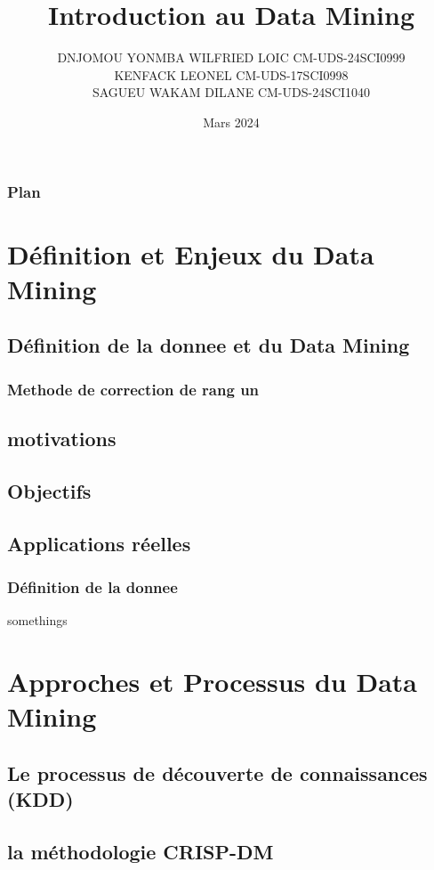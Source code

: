 \documentclass{beamer}
\title{ Introduction au Data Mining}
\author{DNJOMOU YONMBA WILFRIED LOIC CM-UDS-24SCI0999 \\
KENFACK LEONEL CM-UDS-17SCI0998\\
SAGUEU WAKAM DILANE CM-UDS-24SCI1040\\}
\date{Mars 2024}
\begin{document}
\frame{\titlepage}
    
    \begin{frame}
        \frametitle{Plan}
        \tableofcontents
    \end{frame}
    
    \section{Définition et Enjeux du Data Mining} 
        \subsection{Définition de la donnee et du Data Mining }
            \subsubsection{Methode de correction de rang un}
        \subsection{motivations }
        \subsection{Objectifs }
        \subsection{Applications réelles }
            
            
            
    
      \begin{frame}
          \frametitle{Définition de la donnee}
          somethings \\
  
        \end{frame}               
    
     \section{Approches et Processus du Data Mining}
        \subsection{Le processus de découverte de connaissances (KDD) }
        \subsection{la méthodologie CRISP-DM }
            
\end{document}

